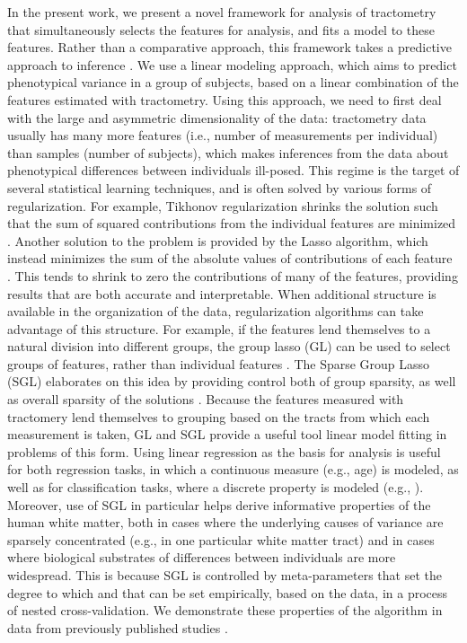 In the present work, we present a novel framework for analysis of tractometry
that simultaneously selects the features for analysis, and fits a model to these
features. Rather than a comparative approach, this framework takes a predictive
approach to inference \cite{Breiman2001}. We use a linear modeling approach,
which aims to predict phenotypical variance in a group of subjects, based on a
linear combination of the features estimated with tractometry. Using this
approach, we need to first deal with the large and asymmetric dimensionality of
the data: tractometry data usually has many more features (i.e., number of
measurements per individual) than samples (number of subjects), which makes
inferences from the data about phenotypical differences between individuals
ill-posed. This regime is the target of several statistical learning techniques,
and is often solved by various forms of regularization. For example, Tikhonov
regularization shrinks the solution such that the sum of squared contributions
from the individual features are minimized \cite{Hoerl2000-ij}. Another solution
to the problem is provided by the Lasso algorithm, which instead minimizes the
sum of the absolute values of contributions of each feature
\cite{Tibshirani1996-qs}. This tends to shrink to zero the contributions of many
of the features, providing results that are both accurate and interpretable.
When additional structure is available in the organization of the data,
regularization algorithms can take advantage of this structure. For example, if
the features lend themselves to a natural division into different groups, the
group lasso (GL) can be used to select groups of features, rather than
individual features \cite{Yuan2006-ky}. The Sparse Group Lasso (SGL) elaborates
on this idea by providing control both of group sparsity, as well as overall
sparsity of the solutions \cite{simon2013sgl}. Because the features measured
with tractomery lend themselves to grouping based on the tracts from which each
measurement is taken, GL and SGL provide a useful tool linear model fitting in
problems of this form. Using linear regression as the basis for analysis is
useful for both regression tasks, in which a continuous measure (e.g., age) is
modeled, as well as for classification tasks, where a discrete property is
modeled (e.g., ). Moreover, use of SGL in particular helps derive informative
properties of the human white matter, both in cases where the underlying causes
of variance are sparsely concentrated (e.g., in one particular white matter
tract) and in cases where biological substrates of differences between
individuals are more widespread. This is because SGL is controlled by
meta-parameters that set the degree to  which and that can be set empirically,
based on the data, in a process of nested cross-validation. We demonstrate these
properties of the algorithm in data from previously published studies
\cite{sarica2017corticospinal, yeatman2014lifespan}.
